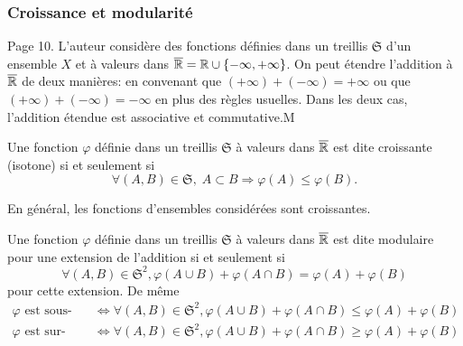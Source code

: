 \subsubsection{Croissance et modularité}
Page 10. L'auteur considère des fonctions définies dans un treillis $\mathfrak{S}$ d'un ensemble $X$ et à valeurs dans $\overline{\mathbb{R}}= \mathbb{R} \cup\{- \infty, + \infty\} $. On peut étendre l'addition à $\overline{\mathbb{R}}$ de deux manières: en convenant que $(+ \infty) + (-\infty) = + \infty$ ou que $(+ \infty) + (-\infty) = - \infty$ en plus des règles usuelles. Dans les deux cas, l'addition étendue est associative et commutative.M
\begin{defi}
  Une fonction $\varphi$ définie dans un treillis $\mathfrak{S}$ à valeurs dans $\overline{\mathbb{R}}$ est dite croissante (isotone) si et seulement si
  \begin{displaymath}
    \forall (A,B) \in \mathfrak{S},\; A \subset B \Rightarrow \varphi(A) \leq \varphi(B).
  \end{displaymath}
\end{defi}
\noindent En général, les fonctions d'ensembles considérées sont croissantes.

\begin{defi}
  Une fonction $\varphi$ définie dans un treillis $\mathfrak{S}$ à valeurs dans $\overline{\mathbb{R}}$ est dite modulaire pour une extension de l'addition si et seulement si
\begin{displaymath}
  \forall (A,B) \in \mathfrak{S}^2, \varphi(A \cup B) + \varphi(A \cap B) = \varphi(A) + \varphi(B)
\end{displaymath}
pour cette extension. De même
\begin{align*}
  \varphi \text{ est sous-modulaire } &\Leftrightarrow \forall (A,B) \in \mathfrak{S}^2, \varphi(A \cup B) + \varphi(A \cap B) \leq \varphi(A) + \varphi(B) \\
  \varphi \text{ est sur-modulaire } &\Leftrightarrow \forall (A,B) \in \mathfrak{S}^2, \varphi(A \cup B) + \varphi(A \cap B) \geq \varphi(A) + \varphi(B)
\end{align*}
\end{defi}

